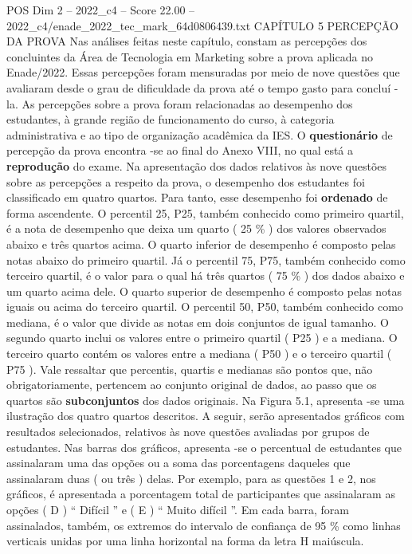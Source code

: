 \begin{textsample}{POS Dim 2 – 2022\_c4 – Score 22.00 – 2022\_c4/enade\_2022\_tec\_mark\_64d0806439.txt}  \label{ex:f2_pos_028}
CAPÍTULO 5 PERCEPÇÃO DA PROVA Nas análises feitas neste capítulo, constam as percepções dos concluintes da Área de Tecnologia em Marketing sobre a prova aplicada no Enade/2022.
Essas percepções foram mensuradas por meio de nove questões que avaliaram desde o grau de dificuldade da prova até o tempo gasto para concluí -la.
As percepções sobre a prova foram relacionadas ao desempenho dos estudantes, à grande região de funcionamento do curso, à categoria administrativa e ao tipo de organização acadêmica da IES.
O \textbf{questionário} de percepção da prova encontra -se ao final do Anexo VIII, no qual está a \textbf{reprodução} do exame.
Na apresentação dos dados relativos às nove questões sobre as percepções a respeito da prova, o desempenho dos estudantes foi classificado em quatro quartos.
Para tanto, esse desempenho foi \textbf{ordenado} de forma ascendente.
O percentil 25, P25, também conhecido como primeiro quartil, é a nota de desempenho que deixa um quarto ( 25 \% ) dos valores observados abaixo e três quartos acima.
O quarto inferior de desempenho é composto pelas notas abaixo do primeiro quartil.
Já o percentil 75, P75, também conhecido como terceiro quartil, é o valor para o qual há três quartos ( 75 \% ) dos dados abaixo e um quarto acima dele.
O quarto superior de desempenho é composto pelas notas iguais ou acima do terceiro quartil.
O percentil 50, P50, também conhecido como mediana, é o valor que divide as notas em dois conjuntos de igual tamanho.
O segundo quarto inclui os valores entre o primeiro quartil ( P25 ) e a mediana.
O terceiro quarto contém os valores entre a mediana ( P50 ) e o terceiro quartil ( P75 ).
Vale ressaltar que percentis, quartis e medianas são pontos que, não obrigatoriamente, pertencem ao conjunto original de dados, ao passo que os quartos são \textbf{subconjuntos} dos dados originais.
Na Figura 5.1, apresenta -se uma ilustração dos quatro quartos descritos.
A seguir, serão apresentados gráficos com resultados selecionados, relativos às nove questões avaliadas por grupos de estudantes.
Nas barras dos gráficos, apresenta -se o percentual de estudantes que assinalaram uma das opções ou a soma das porcentagens daqueles que assinalaram duas ( ou três ) delas.
Por exemplo, para as questões 1 e 2, nos gráficos, é apresentada a porcentagem total de participantes que assinalaram as opções ( D ) “ Difícil ” e ( E ) “ Muito difícil ”.
Em cada barra, foram assinalados, também, os extremos do intervalo de confiança de 95 \% como linhas verticais unidas por uma linha horizontal na forma da letra H maiúscula.

\end{textsample}
